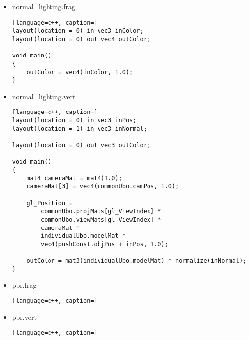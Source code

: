 \begin{itemize}
\begin{lstlisting}[language=c++, caption=]
void main()
{
    mat4 cameraMat = mat4(1.0);
    cameraMat[3] = vec4(ubo.camPos, 1.0);

    gl_Position =
        ubo.projMats[gl_ViewIndex] *
        ubo.viewMat[gl_ViewIndex] *
        cameraMat *
        vec4(pushConst.objPos + cubeVertices[gl_VertexIndex], 1.0);
}
\end{lstlisting}
    \item normal\_lighting.frag
\begin{lstlisting}[language=c++, caption=]
layout(location = 0) in vec3 inColor;
layout(location = 0) out vec4 outColor;

void main()
{
    outColor = vec4(inColor, 1.0);
}
\end{lstlisting}
    \item normal\_lighting.vert
\begin{lstlisting}[language=c++, caption=]
layout(location = 0) in vec3 inPos;
layout(location = 1) in vec3 inNormal;

layout(location = 0) out vec3 outColor;

void main()
{
    mat4 cameraMat = mat4(1.0);
    cameraMat[3] = vec4(commonUbo.camPos, 1.0);

    gl_Position =
        commonUbo.projMats[gl_ViewIndex] *
        commonUbo.viewMats[gl_ViewIndex] *
        cameraMat *
        individualUbo.modelMat *
        vec4(pushConst.objPos + inPos, 1.0);

    outColor = mat3(individualUbo.modelMat) * normalize(inNormal);
}
\end{lstlisting}
    \item pbr.frag
\begin{lstlisting}[language=c++, caption=]
\end{lstlisting}
    \item pbr.vert
\begin{lstlisting}[language=c++, caption=]
\end{lstlisting}
\end{itemize}